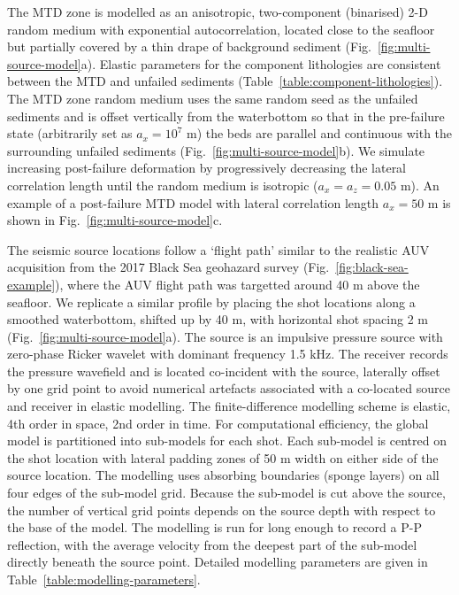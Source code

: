 \documentclass[se,manuscript]{copernicus}
\begin{document}
The MTD zone is modelled as an anisotropic, two-component (binarised) 2-D random medium with exponential autocorrelation, located close to the seafloor but partially covered by a thin drape of background sediment (Fig.~\ref{fig:multi-source-model}a).
Elastic parameters for the component lithologies are consistent between the MTD and unfailed sediments (Table~\ref{table:component-lithologies}).
The MTD zone random medium uses the same random seed as the unfailed sediments and is offset vertically from the waterbottom so that in the pre-failure state (arbitrarily set as $a_x=10^7$ \unit{m}) the beds are parallel and continuous with the surrounding unfailed sediments (Fig.~\ref{fig:multi-source-model}b).
We simulate increasing post-failure deformation by progressively decreasing the lateral correlation length until the random medium is isotropic ($a_x=a_z=0.05$ \unit{m}).
An example of a post-failure MTD model with lateral correlation length $a_x=50$ \unit{m} is shown in Fig.~\ref{fig:multi-source-model}c.

The seismic source locations follow a `flight path' similar to the realistic AUV acquisition from the 2017 Black Sea geohazard survey (Fig.~\ref{fig:black-sea-example}), where the AUV flight path was targetted around 40 \unit{m} above the seafloor.
We replicate a similar profile by placing the shot locations along a smoothed waterbottom, shifted up by 40 \unit{m}, with horizontal shot spacing 2 \unit{m} (Fig.~\ref{fig:multi-source-model}a).
The source is an impulsive pressure source with zero-phase Ricker wavelet with dominant frequency 1.5 \unit{kHz}.
The receiver records the pressure wavefield and is located co-incident with the source, laterally offset by one grid point to avoid numerical artefacts associated with a co-located source and receiver in elastic modelling.
The finite-difference modelling scheme is elastic, 4th order in space, 2nd order in time.
For computational efficiency, the global model is partitioned into sub-models for each shot.
Each sub-model is centred on the shot location with lateral padding zones of 50 \unit{m} width on either side of the source location.
The modelling uses absorbing boundaries (sponge layers) on all four edges of the sub-model grid.
Because the sub-model is cut above the source, the number of vertical grid points depends on the source depth with respect to the base of the model.
The modelling is run for long enough to record a P-P reflection, with the average velocity from the deepest part of the sub-model directly beneath the source point.
Detailed modelling parameters are given in Table~\ref{table:modelling-parameters}.
\end{document}
